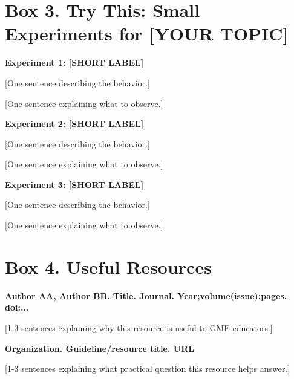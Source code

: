 \documentclass[12pt]{article}
\begin{document}

\section*{Box 3. Try This: Small Experiments for [YOUR TOPIC]}


\textbf{Experiment 1: [SHORT LABEL]}

[One sentence describing the behavior.]

[One sentence explaining what to observe.]

\vspace{0.6em}

\textbf{Experiment 2: [SHORT LABEL]}

[One sentence describing the behavior.]

[One sentence explaining what to observe.]

\vspace{0.6em}

\textbf{Experiment 3: [SHORT LABEL]}

[One sentence describing the behavior.]

[One sentence explaining what to observe.]


\section*{Box 4. Useful Resources}


\textbf{Author AA, Author BB. Title. Journal. Year;volume(issue):pages.
	doi:...}

[1-3 sentences explaining why this resource is useful to GME educators.]

\vspace{0.8em}

\textbf{Organization. Guideline/resource title. URL}

[1-3 sentences explaining what practical question this resource helps answer.]
\end{document}

